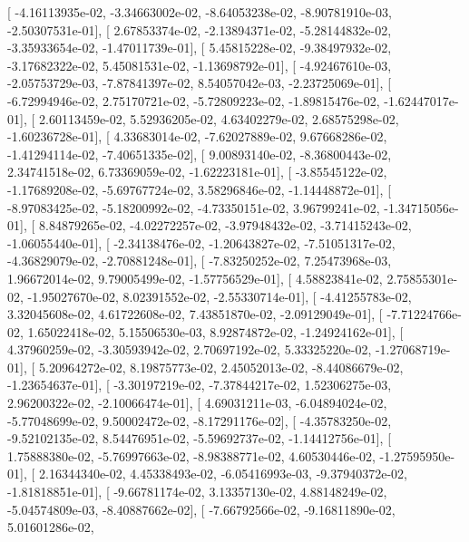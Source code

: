 \documentclass{article}
\begin{document}
       [ -4.16113935e-02,  -3.34663002e-02,  -8.64053238e-02,
         -8.90781910e-03,  -2.50307531e-01],
       [  2.67853374e-02,  -2.13894371e-02,  -5.28144832e-02,
         -3.35933654e-02,  -1.47011739e-01],
       [  5.45815228e-02,  -9.38497932e-02,  -3.17682322e-02,
          5.45081531e-02,  -1.13698792e-01],
       [ -4.92467610e-03,  -2.05753729e-03,  -7.87841397e-02,
          8.54057042e-03,  -2.23725069e-01],
       [ -6.72994946e-02,   2.75170721e-02,  -5.72809223e-02,
         -1.89815476e-02,  -1.62447017e-01],
       [  2.60113459e-02,   5.52936205e-02,   4.63402279e-02,
          2.68575298e-02,  -1.60236728e-01],
       [  4.33683014e-02,  -7.62027889e-02,   9.67668286e-02,
         -1.41294114e-02,  -7.40651335e-02],
       [  9.00893140e-02,  -8.36800443e-02,   2.34741518e-02,
          6.73369059e-02,  -1.62223181e-01],
       [ -3.85545122e-02,  -1.17689208e-02,  -5.69767724e-02,
          3.58296846e-02,  -1.14448872e-01],
       [ -8.97083425e-02,  -5.18200992e-02,  -4.73350151e-02,
          3.96799241e-02,  -1.34715056e-01],
       [  8.84879265e-02,  -4.02272257e-02,  -3.97948432e-02,
         -3.71415243e-02,  -1.06055440e-01],
       [ -2.34138476e-02,  -1.20643827e-02,  -7.51051317e-02,
         -4.36829079e-02,  -2.70881248e-01],
       [ -7.83250252e-02,   7.25473968e-03,   1.96672014e-02,
          9.79005499e-02,  -1.57756529e-01],
       [  4.58823841e-02,   2.75855301e-02,  -1.95027670e-02,
          8.02391552e-02,  -2.55330714e-01],
       [ -4.41255783e-02,   3.32045608e-02,   4.61722608e-02,
          7.43851870e-02,  -2.09129049e-01],
       [ -7.71224766e-02,   1.65022418e-02,   5.15506530e-03,
          8.92874872e-02,  -1.24924162e-01],
       [  4.37960259e-02,  -3.30593942e-02,   2.70697192e-02,
          5.33325220e-02,  -1.27068719e-01],
       [  5.20964272e-02,   8.19875773e-02,   2.45052013e-02,
         -8.44086679e-02,  -1.23654637e-01],
       [ -3.30197219e-02,  -7.37844217e-02,   1.52306275e-03,
          2.96200322e-02,  -2.10066474e-01],
       [  4.69031211e-03,  -6.04894024e-02,  -5.77048699e-02,
          9.50002472e-02,  -8.17291176e-02],
       [ -4.35783250e-02,  -9.52102135e-02,   8.54476951e-02,
         -5.59692737e-02,  -1.14412756e-01],
       [  1.75888380e-02,  -5.76997663e-02,  -8.98388771e-02,
          4.60530446e-02,  -1.27595950e-01],
       [  2.16344340e-02,   4.45338493e-02,  -6.05416993e-03,
         -9.37940372e-02,  -1.81818851e-01],
       [ -9.66781174e-02,   3.13357130e-02,   4.88148249e-02,
         -5.04574809e-03,  -8.40887662e-02],
       [ -7.66792566e-02,  -9.16811890e-02,   5.01601286e-02,
\end{document}
